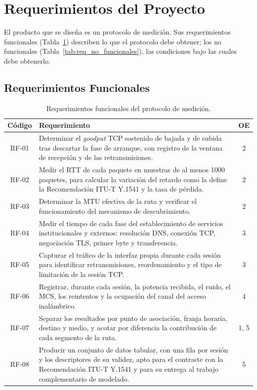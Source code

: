 \section{Requerimientos del Proyecto}

El producto que se diseña es un protocolo de medición. Sus requerimientos funcionales (Tabla~\ref{tab:req_funcionales}) describen lo que el protocolo debe obtener; los no funcionales (Tabla~\ref{tab:req_no_funcionales}), las condiciones bajo las cuales debe obtenerlo.

\subsection{Requerimientos Funcionales}

\begin{table}[htbp]
  \centering
  \caption{Requerimientos funcionales del protocolo de medición.}
  \label{tab:req_funcionales}
  \footnotesize
  \renewcommand{\arraystretch}{1.25}
  \begin{tabularx}{\textwidth}{|c|>{\raggedright\arraybackslash}X|c|}
    \hline
    \textbf{Código} & \textbf{Requerimiento} & \textbf{OE} \\
    \hline
    RF-01 & Determinar el \textit{goodput} TCP sostenido de bajada y de subida tras descartar la fase de arranque, con registro de la ventana de recepción y de las retransmisiones. & 2 \\
    \hline
    RF-02 & Medir el RTT de cada paquete en muestras de al menos 1000 paquetes, para calcular la variación del retardo como la define la Recomendación ITU-T Y.1541 y la tasa de pérdida. & 2 \\
    \hline
    RF-03 & Determinar la MTU efectiva de la ruta y verificar el funcionamiento del mecanismo de descubrimiento. & 2 \\
    \hline
    RF-04 & Medir el tiempo de cada fase del establecimiento de servicios institucionales y externos: resolución DNS, conexión TCP, negociación TLS, primer byte y transferencia. & 3 \\
    \hline
    RF-05 & Capturar el tráfico de la interfaz propia durante cada sesión para identificar retransmisiones, reordenamiento y el tipo de limitación de la sesión TCP. & 3 \\
    \hline
    RF-06 & Registrar, durante cada sesión, la potencia recibida, el ruido, el MCS, los reintentos y la ocupación del canal del acceso inalámbrico. & 4 \\
    \hline
    RF-07 & Separar los resultados por punto de asociación, franja horaria, destino y medio, y acotar por diferencia la contribución de cada segmento de la ruta. & 1, 5 \\
    \hline
    RF-08 & Producir un conjunto de datos tabular, con una fila por sesión y los descriptores de su validez, apto para el contraste con la Recomendación ITU-T Y.1541 y para su entrega al trabajo complementario de modelado. & 5 \\
    \hline
  \end{tabularx}
  \vspace{2pt}
  \raggedright
\end{table}

